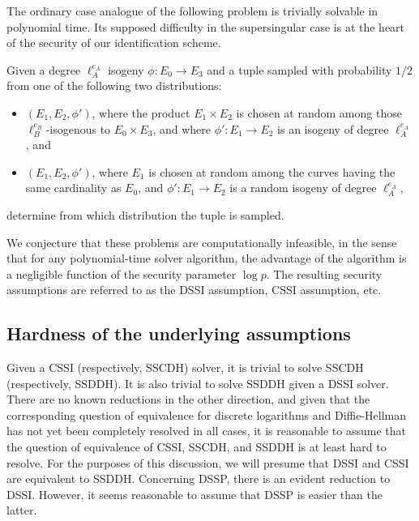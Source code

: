 The ordinary case analogue of the following problem is trivially
solvable in polynomial time. Its supposed difficulty in the
supersingular case is at the heart of the security of our
identification scheme.

\begin{problem}
  Given a degree $\ell_A^{e_A}$ isogeny $\phi:E_0\to E_3$ and a
  tuple sampled with probability $1/2$ from one of the following two
  distributions:
  \begin{itemize} 
  \item $(E_1,E_2,\phi')$, where the product $E_1\times E_2$ is chosen
    at random among those $\ell_B^{e_B}$-isogenous to $E_0\times E_3$,
    and where $\phi':E_1\to E_2$ is an isogeny of degree
    $\ell_A^{e_A}$, and
  \item $(E_1,E_2,\phi')$, where $E_1$ is chosen at random among the
    curves having the same cardinality as $E_0$, and $\phi':E_1\to
    E_2$ is a random isogeny of degree $\ell_A^{e_A}$,
  \end{itemize}
  determine from which distribution the tuple is sampled.
\end{problem}

We conjecture that these problems are computationally infeasible, in
the sense that for any polynomial-time solver algorithm, the advantage
of the algorithm is a negligible function of the security parameter
$\log p$. The resulting security assumptions are referred to as the
DSSI assumption, CSSI assumption, etc.


\subsection{Hardness of the underlying
  assumptions}\label{subsec:hardness}

Given a CSSI (respectively, SSCDH) solver, it is trivial to solve
SSCDH (respectively, SSDDH). It is also trivial to solve SSDDH given a
DSSI solver. There are no known reductions in the other direction, and
given that the corresponding question of equivalence for discrete
logarithms and Diffie-Hellman has not yet been completely resolved in
all cases, it is reasonable to assume that the question of equivalence
of CSSI, SSCDH, and SSDDH is at least hard to resolve. For the
purposes of this discussion, we will presume that DSSI and CSSI are
equivalent to SSDDH. Concerning DSSP, there is an evident reduction to
DSSI. However, it seems reasonable to assume that DSSP is easier than the
latter.

